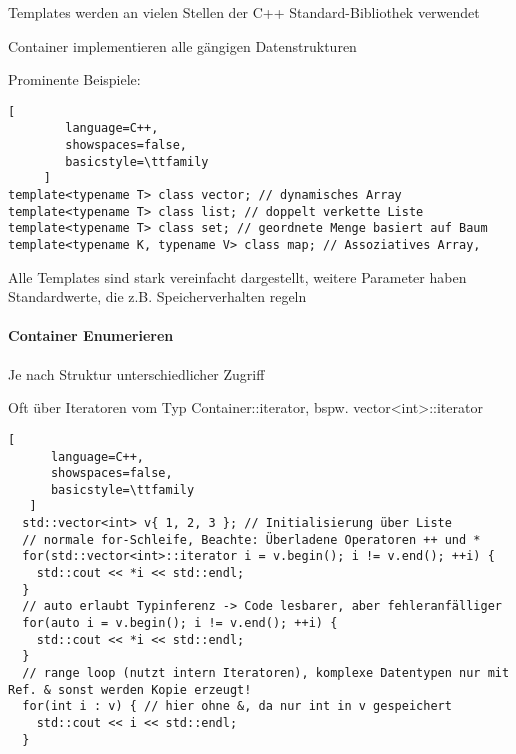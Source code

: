 \documentclass[10pt]{article}
\begin{document}
\begin{itemize*}
\begin{itemize*}
  \item Templates werden an vielen Stellen der C++ Standard-Bibliothek verwendet
  \item Container implementieren alle gängigen Datenstrukturen
  \item Prominente Beispiele:
  \begin{lstlisting}[
        language=C++,
        showspaces=false,
        basicstyle=\ttfamily
     ]
template<typename T> class vector; // dynamisches Array
template<typename T> class list; // doppelt verkette Liste
template<typename T> class set; // geordnete Menge basiert auf Baum
template<typename K, typename V> class map; // Assoziatives Array,
\end{lstlisting}
  \item Alle Templates sind stark vereinfacht dargestellt, weitere Parameter haben Standardwerte, die z.B. Speicherverhalten regeln
\end{itemize*}


\paragraph{Container Enumerieren}
\begin{itemize*}
  \item Je nach Struktur unterschiedlicher Zugriff
  \item Oft über Iteratoren vom Typ Container::iterator, bspw. vector<int>::iterator
\end{itemize*}
\begin{lstlisting}[
      language=C++,
      showspaces=false,
      basicstyle=\ttfamily
   ]
  std::vector<int> v{ 1, 2, 3 }; // Initialisierung über Liste
  // normale for-Schleife, Beachte: Überladene Operatoren ++ und *
  for(std::vector<int>::iterator i = v.begin(); i != v.end(); ++i) {
    std::cout << *i << std::endl;
  }
  // auto erlaubt Typinferenz -> Code lesbarer, aber fehleranfälliger
  for(auto i = v.begin(); i != v.end(); ++i) {
    std::cout << *i << std::endl;
  }
  // range loop (nutzt intern Iteratoren), komplexe Datentypen nur mit Ref. & sonst werden Kopie erzeugt!
  for(int i : v) { // hier ohne &, da nur int in v gespeichert
    std::cout << i << std::endl;
  }
  \end{lstlisting}



\end{itemize*}
\end{document}
